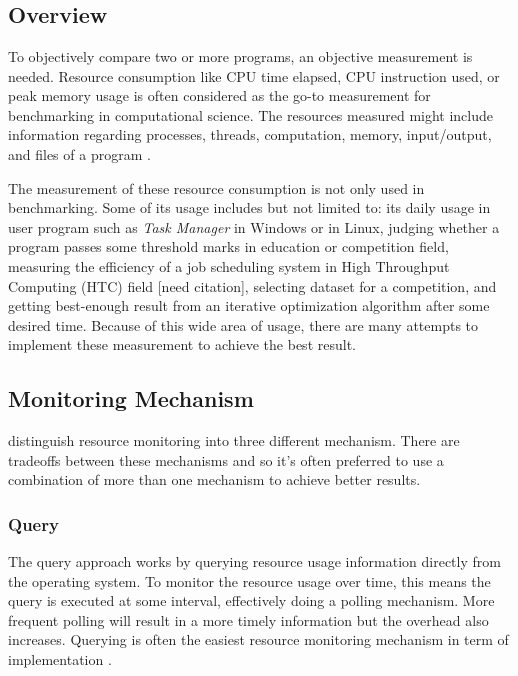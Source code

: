 \chapter{\babEmpat}

\section{Overview}

To objectively compare two or more programs, an objective measurement is needed.
Resource consumption like CPU time elapsed, CPU instruction used, or peak memory usage is often considered as the go-to measurement for benchmarking in computational science.
The resources measured might include information regarding processes, threads, computation, memory, input/output, and files of a program \citep{juvePracticalResourceMonitoring2015}.

The measurement of these resource consumption is not only used in benchmarking.
Some of its usage includes but not limited to:
its daily usage in user program such as \textit{Task Manager} in Windows or  in Linux,
judging whether a program passes some threshold marks in education or competition field,
measuring the efficiency of a job scheduling system in High Throughput Computing (HTC) field [need citation],
selecting dataset for a competition,
and getting best-enough result from an iterative optimization algorithm after some desired time.
Because of this wide area of usage, there are many attempts to implement these measurement to achieve the best result.

\section{Monitoring Mechanism}

\citet{juvePracticalResourceMonitoring2015} distinguish resource monitoring into three different mechanism.
There are tradeoffs between these mechanisms and so it's often preferred to use a combination of more than one mechanism to achieve better results.

\subsection{Query}

The query approach works by querying resource usage information directly from the operating system.
To monitor the resource usage over time, this means the query is executed at some interval, effectively doing a polling mechanism.
More frequent polling will result in a more timely information but the overhead also increases.
Querying is often the easiest resource monitoring mechanism in term of implementation \citep{juvePracticalResourceMonitoring2015}.

